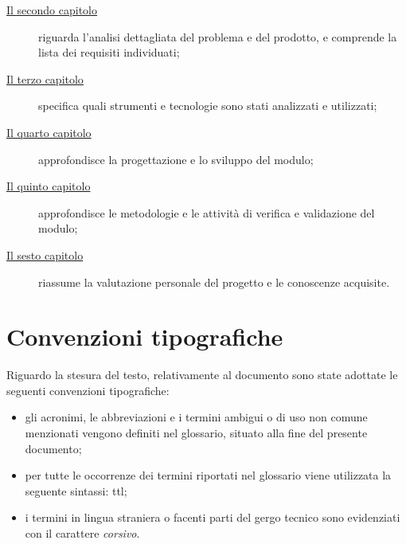 \begin{description}
    \item[{\hyperref[cap:analisi-del-problema]{Il secondo capitolo}}] riguarda l’analisi dettagliata del problema e del prodotto, e comprende la lista dei requisiti individuati;
    
    \item[{\hyperref[cap:strumenti-e-tecnologie]{Il terzo capitolo}}] specifica quali strumenti e tecnologie sono stati analizzati e utilizzati;
    
    \item[{\hyperref[cap:progettazione-codifica]{Il quarto capitolo}}] approfondisce la progettazione e lo sviluppo del modulo;
    
    \item[{\hyperref[cap:verifica-validazione]{Il quinto capitolo}}] approfondisce le metodologie e le attività di verifica e validazione del modulo;
    
    \item[{\hyperref[cap:conclusioni]{Il sesto capitolo}}] riassume la valutazione personale del progetto e le conoscenze acquisite.
\end{description}

\section{Convenzioni tipografiche}

Riguardo la stesura del testo, relativamente al documento sono state adottate le seguenti convenzioni tipografiche:
\begin{itemize}
	\item gli acronimi, le abbreviazioni e i termini ambigui o di uso non comune menzionati vengono definiti nel glossario, situato alla fine del presente documento;
	\item per tutte le occorrenze dei termini riportati nel glossario viene utilizzata la seguente sintassi: \gls{ttl};
	\item i termini in lingua straniera o facenti parti del gergo tecnico sono evidenziati con il carattere \emph{corsivo}.
\end{itemize}